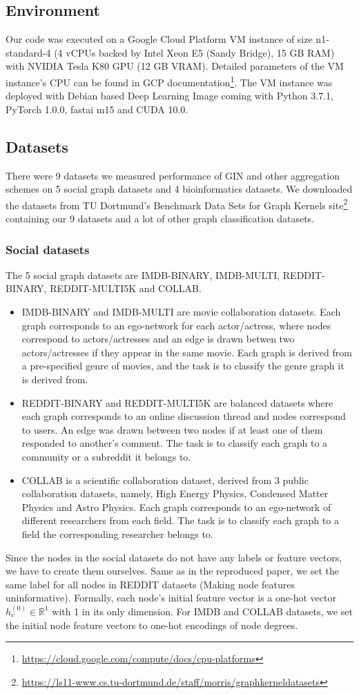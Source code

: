 \documentclass{article} %
\begin{document}
\subsection{Environment}
Our code was executed on a Google Cloud Platform VM instance of size n1-standard-4 (4 vCPUs backed by Intel Xeon E5 (Sandy Bridge), 15 GB RAM) with NVIDIA Tesla K80 GPU (12 GB VRAM). Detailed parameters of the VM instance's CPU can be found in GCP documentation\footnote{\url{https://cloud.google.com/compute/docs/cpu-platforms}}. The VM instance was deployed with Debian based Deep Learning Image coming with Python 3.7.1, PyTorch 1.0.0, fastai m15 and CUDA 10.0.

\subsection{Datasets}
There were 9 datasets we measured performance of GIN and other aggregation schemes on 5 social graph datasets and 4 bioinformatics datasets. We downloaded the datasets from TU Dortmund's Benchmark Data Sets for Graph Kernels site\footnote{\url{https://ls11-www.cs.tu-dortmund.de/staff/morris/graphkerneldatasets}} containing our 9 datasets and a lot of other graph classification datasets.

\subsubsection{Social datasets}
The 5 social graph datasets are IMDB-BINARY, IMDB-MULTI, REDDIT-BINARY, REDDIT-MULTI5K and COLLAB.
\begin{itemize}
    \item IMDB-BINARY and IMDB-MULTI are movie collaboration datasets. Each graph corresponds to an ego-network for each actor/actress, where nodes correspond to actors/actresses and an edge is drawn betwen two actors/actresses if they appear in the same movie. Each graph is derived from a pre-specified genre of movies, and the task is to classify the genre graph it is derived from.
    \item REDDIT-BINARY and REDDIT-MULTI5K are balanced datasets where each graph corresponds to an online discussion thread and nodes correspond to users. An edge was drawn between two nodes if at least one of them responded to another’s comment. The task is to classify each graph to a community or a subreddit it belongs to.
    \item COLLAB is a scientific collaboration dataset, derived from 3 public collaboration datasets, namely, High Energy Physics, Condensed Matter Physics and Astro Physics. Each graph corresponds to an ego-network of different researchers from each field. The task is to classify each graph to a field the corresponding researcher belongs to.
\end{itemize}
Since the nodes in the social datasets do not have any labels or feature vectors, we have to create them ourselves. Same as in the reproduced paper, we set the same label for all nodes in REDDIT datasets (Making node features uninformative). Formally, each node's initial feature vector is a one-hot vector $h_v^{(0)} \in \mathbb{R}^1$ with 1 in its only dimension. For IMDB and COLLAB datasets, we set the initial node feature vectors to one-hot encodings of node degrees.
\end{document}
